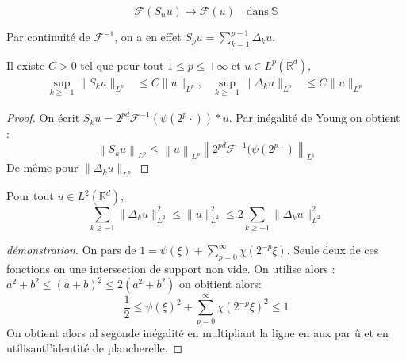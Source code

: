 \documentclass{article}
\begin{document}
\[
\mathcal{F}(S_n u) \to \mathcal{F}(u) \quad \text{dans} \ \mathbb{S}
\]

Par continuité de $\mathcal{F}^{-1}$, on a en effet $S_p u = \sum_{k=1}^{p-1} \Delta_k u$.
     
     

\begin{lemma}[Lemme]\label{young}
Il existe $C > 0$ tel que pour tout $1 \leq p \leq +\infty$ et $u \in L^p(\mathbb{R}^d)$,
\begin{align*}
\sup_{k \geq -1} \|S_k u\|_{L^p} &\leq C \|u\|_{L^p}, & \sup_{k \geq -1} \|\Delta_k u\|_{L^p} &\leq C \|u\|_{L^p}
\end{align*}
\end{lemma}
\begin{proof}
On écrit $S_k u = 2^{pd} \mathcal{F}^{-1}(\psi(2^p\cdot))\ast u$. Par inégalité de Young on obtient :
$$\left\lVert S_k u \right\rVert_{L^p} \leq \left\lVert u \right\rVert_{L^p} \left\lVert 2^{pd} \mathcal{F}^{-1}(\psi(2^p\cdot)  \right\rVert_{L^1}$$ 
De même pour $\|\Delta_k u\|_{L^p}$ 

\end{proof}

\begin{lemma}
Pour tout $u \in L^2(\mathbb{R}^d)$,
\begin{equation}\label{qortho}
\sum_{k \geq -1} \|\Delta_k u \|^2_{L^2} \leq \|u\|^2_{L^2} \leq 2 \sum_{k \geq -1} \|\Delta_k u \|^2_{L^2}
\end{equation}
\end{lemma}
\begin{proof}[démonstration]
On pars de $1= \psi(\xi) + \sum_{p=0}^\infty \chi(2^{-p} \xi)$.
Seule deux de ces fonctions on une intersection de support non vide. On utilise alors : $a^2 +b^2 \leq (a+b)^2 \leq 2(a^2 +b^2)$ on obitient alors:
$$ \frac{1}{2} \leq \psi(\xi)^2 + \sum_{p=0}^\infty \chi(2^{-p} \xi)^2 \leq 1$$
On obtient alors al segonde inégalité en multipliant la ligne en aux par û et en utilisantl'identité de  plancherelle.
\end{proof}
\end{document}
